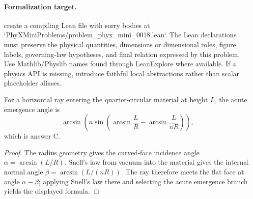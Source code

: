\paragraph{Formalization target.}
create a compiling Lean file with sorry bodies at `PhyXMiniProblems/problem\_phyx\_mini\_0018.lean`. The Lean declarations must preserve the physical quantities, dimensions or dimensional roles, figure labels, governing-law hypotheses, and final relation expressed by this problem.
Use Mathlib/Physlib names found through LeanExplore where available. If a physics API is missing, introduce faithful local abstractions rather than scalar placeholder aliases.

\begin{theorem}
\label{thm:physics:phyx_mini_0018:target}
For a horizontal ray entering the quarter-circular material at height \(L\),
the acute emergence angle is
\[
\arcsin\!\left(
 n\sin\!\left(\arcsin\frac LR-\arcsin\frac{L}{nR}\right)\right),
\]
which is answer C.
\end{theorem}
\begin{proof}
The radius geometry gives the curved-face incidence angle
\(\alpha=\arcsin(L/R)\).  Snell's law from vacuum into the material gives
the internal normal angle \(\beta=\arcsin(L/(nR))\).  The ray therefore meets
the flat face at angle \(\alpha-\beta\); applying Snell's law there and
selecting the acute emergence branch yields the displayed formula.
\end{proof}

